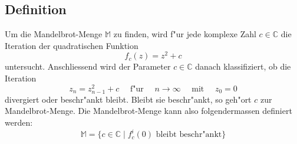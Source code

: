 \begin{refsection}
\subsection{Definition}
Um die Mandelbrot-Menge $\mathbb{M}$ zu finden, wird f"ur jede komplexe
Zahl $c\in\mathbb{C}$ die Iteration der quadratischen Funktion
\begin{equation}
	f_c(z) = z^2+c
	\label{equ. itformel}
\end{equation}
untersucht. Anschliessend wird der Parameter $c\in\mathbb{C}$ danach
klassifiziert, ob die Iteration
\begin{equation}
	z_{n} = z_{n-1}^2+c\quad\text{ f"ur }\quad n\rightarrow\infty \quad\text{ mit }\quad z_0 = 0
	\label{equ. rekformel}
\end{equation}
divergiert oder beschr"ankt bleibt. Bleibt sie beschr"ankt, so geh"ort
$c$ zur Mandelbrot-Menge. Die Mandelbrot-Menge kann also folgendermassen
definiert werden:
\begin{equation}
	\mathbb{M} = \{c\in\mathbb{C}\;|\; f_c^i(0) \text{ bleibt beschr"ankt}\}
	\label{equ. defMandelbrotmengeComplex}
\end{equation}	



\end{refsection}
